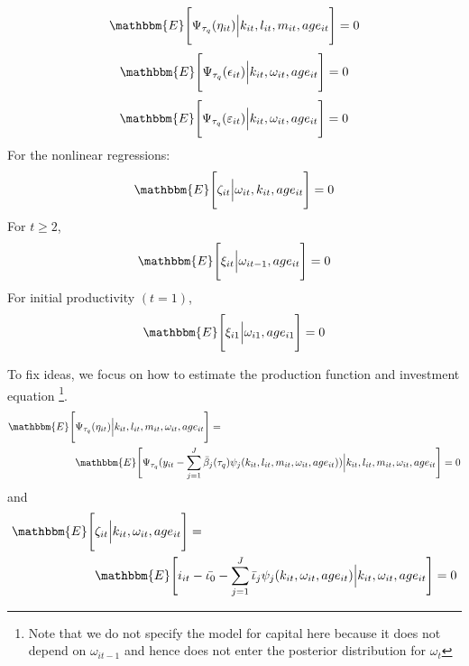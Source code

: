 \documentclass{article}
\begin{document}
\begin{equation}\label{ymoment}
\mathbbm{E}\Bigg[\Psi_{\tau_{q}}(\eta_{it})\Big|k_{it}, l_{it}, m_{it}, age_{it}\Bigg]=0
\end{equation}
\begin{equation}\label{lmoment}
\mathbbm{E}\Bigg[\Psi_{\tau_{q}}(\epsilon_{it})\Big|k_{it}, \omega_{it}, age_{it}\Bigg]=0
\end{equation}
\begin{equation}\label{mmoment}
\mathbbm{E}\Bigg[\Psi_{\tau_{q}}(\varepsilon_{it})\Big|k_{it}, \omega_{it}, age_{it}\Bigg]=0
\end{equation}
For the nonlinear regressions:
\begin{equation}\label{iemoment}
\mathbbm{E}\Bigg[\zeta_{it}\Big|\omega_{it}, k_{it}, age_{it}\Bigg]=0
\end{equation}
For $t\geq 2$,
\begin{equation}\label{omegamoment}
\mathbbm{E}\Bigg[\xi_{it}\Big|\omega_{it-1}, age_{it}\Bigg]=0
\end{equation}
For initial productivity $(t=1)$,
\begin{equation}\label{omega1qmoment}
\mathbbm{E}\Bigg[\xi_{i1}\Big|\omega_{i1}, age_{i1}\Bigg]=0
\end{equation}



To fix ideas, we focus on how to estimate the production function and investment equation \footnote{Note that we do not specify the model for capital here because it does not depend on $\omega_{it-1}$ and hence does not enter the posterior distribution for $\omega_{t}$}. \\

\begin{equation}\label{ymoment}
\begin{split}
\mathbbm{E}\Bigg[&\Psi_{\tau_{q}}(\eta_{it})\Big|k_{it}, l_{it}, m_{it}, \omega_{it}, age_{it}\Bigg]=\\
&\mathbbm{E}\Bigg[\Psi_{\tau_{q}}(y_{it}-\sum_{j=1}^{J}\bar{\beta}_{j}(\tau_{q})\psi_{j}(k_{it}, l_{it}, m_{it}, \omega_{it}, age_{it}))\Big|k_{it}, l_{it}, m_{it}, \omega_{it}, age_{it}\Bigg]=0
\end{split}
\end{equation}
and 
\begin{equation}\label{imoment}
\begin{split}
\mathbbm{E}\Bigg[&\zeta_{it}\Big|k_{it}, \omega_{it}, age_{it}\Bigg]=\\
&\mathbbm{E}\Bigg[i_{it}-\bar{\iota_{0}}-\sum_{j=1}^{J}\bar{\iota}_{j}\psi_{j}(k_{it}, \omega_{it}, age_{it})\Big|k_{it}, \omega_{it}, age_{it}\Bigg]=0
\end{split}
\end{equation}
\end{document}
